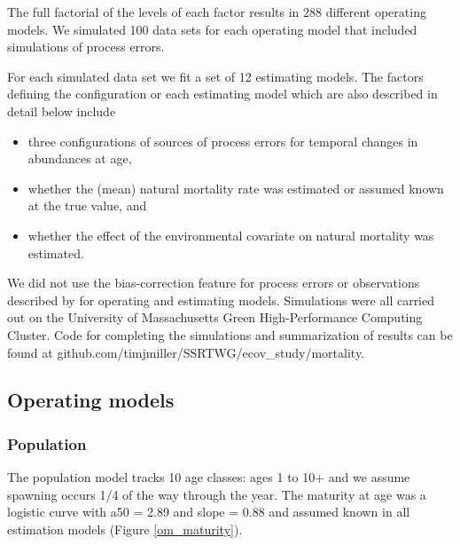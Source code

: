 \documentclass[
  12pt,
]{article}
\begin{document}
The full factorial of the levels of each factor results in 288 different
operating models. We simulated 100 data sets for each operating model
that included simulations of process errors.

For each simulated data set we fit a set of 12 estimating models. The
factors defining the configuration or each estimating model which are
also described in detail below include

\begin{itemize}
\item three configurations of sources of process errors for temporal changes in abundances at age, 
\item whether the (mean) natural mortality rate was estimated or assumed known at the true value, and
\item whether the effect of the environmental covariate on natural mortality was estimated.
\end{itemize}

We did not use the bias-correction feature for process errors or
observations described by \citet{stockmiller21} for operating and
estimating models. Simulations were all carried out on the University of
Massachusetts Green High-Performance Computing Cluster. Code for
completing the simulations and summarization of results can be found at
github.com/timjmiller/SSRTWG/ecov\_study/mortality.

\hypertarget{operating-models}{%
\subsection*{Operating models}\label{operating-models}}

\hypertarget{population}{%
\subsubsection*{Population}\label{population}}

The population model tracks 10 age classes: ages 1 to 10+ and we assume
spawning occurs 1/4 of the way through the year. The maturity at age was
a logistic curve with a50 = 2.89 and slope = 0.88 and assumed known in
all estimation models (Figure \ref{om_maturity}).
\end{document}

